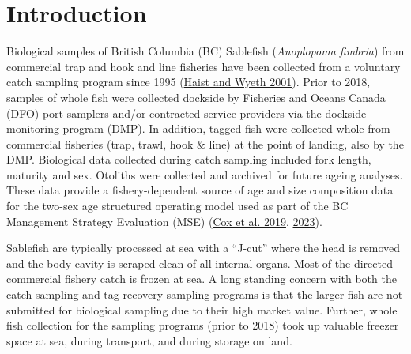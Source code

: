 \documentclass[12pt]{article}\usepackage[]{graphicx}\usepackage[]{color}
\begin{document}

\frontmatter


\renewcommand{\headrulewidth}{0.5pt}  %
\renewcommand{\footrulewidth}{0.5pt}  %

\newcommand{\lt}{\ensuremath <}
\newcommand{\gt}{\ensuremath >}

\newlength{\cslhangindent}
\setlength{\cslhangindent}{1.5em}
\newenvironment{cslreferences}%
  {}%
  {\par}

\hypertarget{introduction}{%
\section{Introduction}\label{introduction}}

Biological samples of British Columbia (BC) Sablefish (\emph{Anoplopoma fimbria}) from commercial trap and hook and line fisheries have been collected from a voluntary catch sampling program since 1995 (\protect\hyperlink{ref-Haist2001}{Haist and Wyeth 2001}). Prior to 2018, samples of whole fish were collected dockside by Fisheries and Oceans Canada (DFO) port samplers and/or contracted service providers via the dockside monitoring program (DMP). In addition, tagged fish were collected whole from commercial fisheries (trap, trawl, hook \& line) at the point of landing, also by the DMP. Biological data collected during catch sampling included fork length, maturity and sex. Otoliths were collected and archived for future ageing analyses. These data provide a fishery-dependent source of age and size composition data for the two-sex age structured operating model used as part of the BC Management Strategy Evaluation (MSE) (\protect\hyperlink{ref-Cox2019}{Cox et al. 2019}, \protect\hyperlink{ref-Cox2023}{2023}).

Sablefish are typically processed at sea with a ``J-cut'' where the head is removed and the body cavity is scraped clean of all internal organs. Most of the directed commercial fishery catch is frozen at sea. A long standing concern with both the catch sampling and tag recovery sampling programs is that the larger fish are not submitted for biological sampling due to their high market value. Further, whole fish collection for the sampling programs (prior to 2018) took up valuable freezer space at sea, during transport, and during storage on land.
\end{document}
